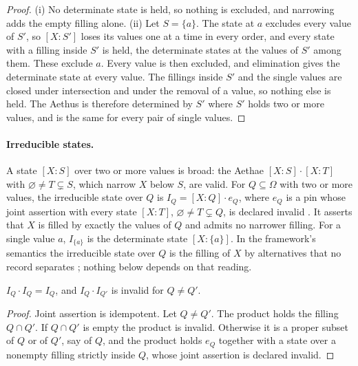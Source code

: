 \begin{proof}
(i) No determinate state is held, so nothing is excluded, and narrowing adds the empty filling alone. (ii) Let $S = \{a\}$. The state at $a$ excludes every value of $S'$, so $[X:S']$ loses its values one at a time in every order, and every state with a filling inside $S'$ is held, the determinate states at the values of $S'$ among them. These exclude $a$. Every value is then excluded, and elimination gives the determinate state at every value. The fillings inside $S'$ and the single values are closed under intersection and under the removal of a value, so nothing else is held. The Aethus is therefore determined by $S'$ where $S'$ holds two or more values, and is the same for every pair of single values.
\end{proof}

\paragraph{Irreducible states.} A state $[X:S]$ over two or more values is broad: the Aethae $[X:S]\cdot[X:T]$ with $\varnothing \neq T \subsetneq S$, which narrow $X$ below $S$, are valid. For $Q \subseteq \Omega$ with two or more values, the irreducible state over $Q$ is $I_Q = [X:Q] \cdot e_Q$, where $e_Q$ is a pin whose joint assertion with every state $[X:T]$, $\varnothing \neq T \subsetneq Q$, is declared invalid \cite{Aethus}. It asserts that $X$ is filled by exactly the values of $Q$ and admits no narrower filling. For a single value $a$, $I_{\{a\}}$ is the determinate state $[X:\{a\}]$. In the framework's semantics the irreducible state over $Q$ is the filling of $X$ by alternatives that no record separates \cite{Aethus}; nothing below depends on that reading.

\begin{lemma}\label{lem:orth}
$I_Q \cdot I_Q = I_Q$, and $I_Q \cdot I_{Q'}$ is invalid for $Q \neq Q'$.
\end{lemma}

\begin{proof}
Joint assertion is idempotent. Let $Q \neq Q'$. The product holds the filling $Q \cap Q'$. If $Q \cap Q'$ is empty the product is invalid. Otherwise it is a proper subset of $Q$ or of $Q'$, say of $Q$, and the product holds $e_Q$ together with a state over a nonempty filling strictly inside $Q$, whose joint assertion is declared invalid.
\end{proof}

